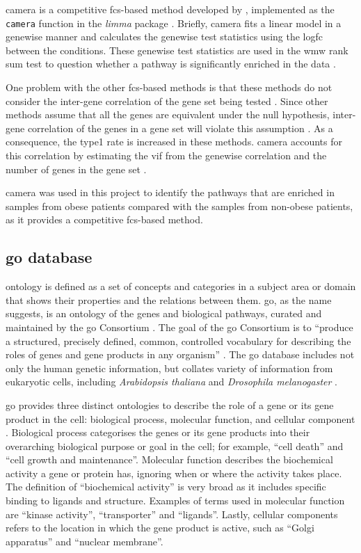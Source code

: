 \Acrfull{camera} is a competitive \gls{fcs}-based method developed by \citet{Wu2012}, implemented as the \texttt{camera} function in the \textit{limma} package \citep{Ritchie2015}.
Briefly, \gls{camera} fits a linear model in a genewise manner and calculates the genewise test statistics using the log\gls{fc} between the conditions.
These genewise test statistics are used in the \gls{wmw} rank sum test to question whether a pathway is significantly enriched in the data \citep{Wu2012}.

One problem with the other \gls{fcs}-based methods is that these methods do not consider the inter-gene correlation of the gene set being tested \citep{Wu2012}.
Since other methods assume that all the genes are equivalent under the null hypothesis, inter-gene correlation of the genes in a gene set will violate this assumption \citep{Wu2012}.
As a consequence, the \gls{type1} rate is increased in these methods.
\Gls{camera} accounts for this correlation by estimating the \gls{vif} from the genewise correlation and the number of genes in the gene set \citep{Wu2012}.

\gls{camera} was used in this project to identify the pathways that are enriched in samples from obese patients compared with the samples from non-obese patients, as it provides a competitive \gls{fcs}-based method.

\subsection{\gls{go} database}
\label{sub:go_database}

\Gls{ontology} is defined as a set of concepts and categories in a subject area or domain that shows their properties and the relations between them.
\Acrfull{go}, as the name suggests, is an \gls{ontology} of the genes and biological pathways, curated and maintained by the \gls{go} Consortium \citep{GO2000,GO2004}.
The goal of the \gls{go} Consortium is to ``produce a structured, precisely defined, common, controlled vocabulary for describing the roles of genes and gene products in any organism'' \citep{GO2000}.
The \gls{go} database includes not only the human genetic information, but collates variety of information from eukaryotic cells, including \textit{Arabidopsis thaliana} and \textit{Drosophila melanogaster} \citep{GO2000,GO2004}.

\gls{go} provides three distinct ontologies to describe the role of a gene or its gene product in the cell: biological process, molecular function, and cellular component \citep{GO2000}.
Biological process categorises the genes or its gene products into their overarching biological purpose or goal in the cell; for example, ``cell death'' and ``cell growth and maintenance''.
Molecular function describes the biochemical activity a gene or protein has, ignoring when or where the activity takes place.
The definition of ``biochemical activity'' is very broad as it includes specific binding to ligands and structure.
Examples of terms used in molecular function are ``kinase activity'', ``transporter'' and ``ligands''.
Lastly, cellular components refers to the location in which the gene product is active, such as ``Golgi apparatus'' and ``nuclear membrane''.

